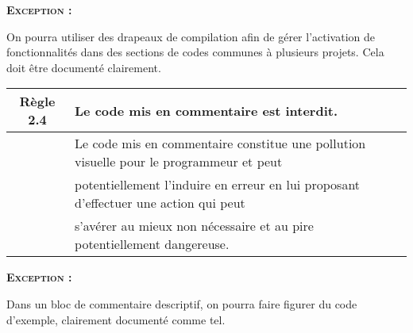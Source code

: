 \smallskip
\begin{large}
\textbf{\textsc{Exception :}}
\end{large}
On pourra utiliser des drapeaux de compilation afin de gérer l'activation de fonctionnalités dans des sections de codes communes à plusieurs projets. Cela doit être documenté clairement.

\medskip

\begin{center}
\begin{tabular}{|c l|}
\hline
\rowcolor{red!10}\textbf{Règle 2.4} & Le code mis en commentaire est interdit. \\ \hline
 & Le code mis en commentaire constitue une pollution visuelle pour le programmeur et peut \\
 & potentiellement l'induire en erreur en lui proposant d'effectuer une action qui peut \\
 & s'avérer au mieux non nécessaire et au pire potentiellement dangereuse. \\ \hline
\hline
\end{tabular}
\end{center}

\smallskip
\begin{large}
\textbf{\textsc{Exception :}}
\end{large}
Dans un bloc de commentaire descriptif, on pourra faire figurer du code d'exemple, clairement documenté comme tel.


\pagebreak

